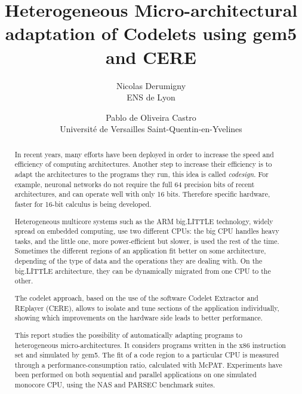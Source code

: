 \documentclass{article}
\title{Heterogeneous Micro-architectural adaptation of Codelets using gem5 and CERE}
\author{Nicolas Derumigny \\
\small ENS de Lyon 
\and Pablo de Oliveira Castro\\ 
\small Université de Versailles Saint-Quentin-en-Yvelines}
\date{}
\begin{document}
\maketitle

\smallskip

\begin{abstract}
In recent years, many efforts have been deployed in order to increase the speed and efficiency of computing architectures. Another step to increase their efficiency is to adapt the architectures to the programs they run, this idea is called \emph{codesign}. For example, neuronal networks do not require the full 64 precision bits of recent architectures, and can operate well with only 16 bits. Therefore specific hardware, faster for 16-bit calculus is being developed.


Heterogeneous multicore systems such as the ARM big.LITTLE technology, widely spread on embedded computing, use two different CPUs: the big CPU handles heavy tasks, and the little one, more power-efficient but slower, is used the rest of the time. Sometimes the different regions of an application fit better on some architecture, depending of the type of data and the operations they are dealing with. On the big.LITTLE architecture, they can be dynamically migrated from one CPU to the other. 

The codelet approach, based on the use of the software Codelet Extractor and REplayer (CERE), allows to isolate and tune sections of the application individually, showing which improvements on the hardware side leads to better performance. 


This report studies the possibility of automatically adapting programs to heterogeneous micro-architectures. It considers programs written in the x86 instruction set and simulated by gem5. The fit of a code region to a particular CPU is measured through a performance-consumption ratio, calculated with McPAT.
Experiments have been performed on both sequential and parallel applications on one simulated monocore CPU, using the NAS and PARSEC benchmark suites.

\end{abstract}
\end{document}
